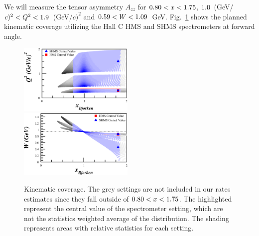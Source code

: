




\label{EXP}
We will measure the tensor asymmetry $A_{zz}$ for $0.80<x<1.75$, $1.0$~(GeV/$c)^2 < Q^2 <1.9$~(GeV/$c)^2$ and $0.59 < W < 1.09$~GeV. Fig.~\ref{kincov} shows the planned kinematic coverage utilizing the Hall C HMS and SHMS spectrometers at forward angle.

\begin{figure}
\begin{center}
\includegraphics[width=0.49\textwidth]{figs/Pzz_30_all_q2.eps}~~
\includegraphics[width=0.49\textwidth]{figs/Pzz_30_all_w.eps} %

\caption{\label{kincov} Kinematic coverage.  The grey settings are not included in our rates estimates since they fall outside of $0.80 < x < 1.75$. The highlighted represent the central value of the spectrometer setting, which are not the statistics weighted average of the distribution. The shading represents areas with relative statistics for each setting.}
\end{center}
\end{figure}


